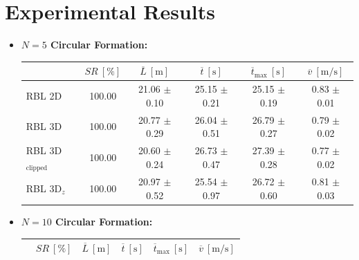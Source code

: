 \chapter{Experimental Results}
    \label{chap:exp_sim_res}
    \begin{itemize}
        \item \textbf{$N = 5$ Circular Formation:}
            \begin{table}[H]
                \centering
                \renewcommand{\arraystretch}{1.2}
                \begin{tabular}{|l|c|c|c|c|c|}
                \hline
                                            & \( SR \ [\%] \) & \( \overline{L} \ [\mathrm{m}] \) & \( \overline{t} \ [\mathrm{s}] \) & \( \overline{t}_{\text{max}} \ [\mathrm{s}] \) & \( \overline{v} \ [\mathrm{m/s}] \)     \\ \hline
                RBL 2D                      & 100.00          & 21.06 $\pm$ 0.10                  & 25.15 $\pm$ 0.21                  & 25.15 $\pm$ 0.19                               & 0.83 $\pm$ 0.01                         \\ \hline
                RBL 3D                      & 100.00          & 20.77 $\pm$ 0.29                  & 26.04 $\pm$ 0.51                  & 26.79 $\pm$ 0.27                               & 0.79 $\pm$ 0.02                         \\ \hline
                RBL 3D\(_{\text{clipped}}\) & 100.00          & 20.60 $\pm$ 0.24                  & 26.73 $\pm$ 0.47                  & 27.39 $\pm$ 0.28                               & 0.77 $\pm$ 0.02                         \\ \hline
                RBL 3D\(_z\)                & 100.00          & 20.97 $\pm$ 0.52                  & 25.54 $\pm$ 0.97                  & 26.72 $\pm$ 0.60                               & 0.81 $\pm$ 0.03                         \\ \hline
                \end{tabular}
            \end{table}
        \item \textbf{$N = 10$ Circular Formation:}
            \begin{table}[H]
                \centering
                \renewcommand{\arraystretch}{1.2}
                \begin{tabular}{|l|c|c|c|c|c|}
                \hline
                                            & \( SR \ [\%] \) & \( \overline{L} \ [\mathrm{m}] \) & \( \overline{t} \ [\mathrm{s}] \) & \( \overline{t}_{\text{max}} \ [\mathrm{s}] \) & \( \overline{v} \ [\mathrm{m/s}] \)     \\ \hline

\end{tabular}
\end{table}
\end{itemize}
